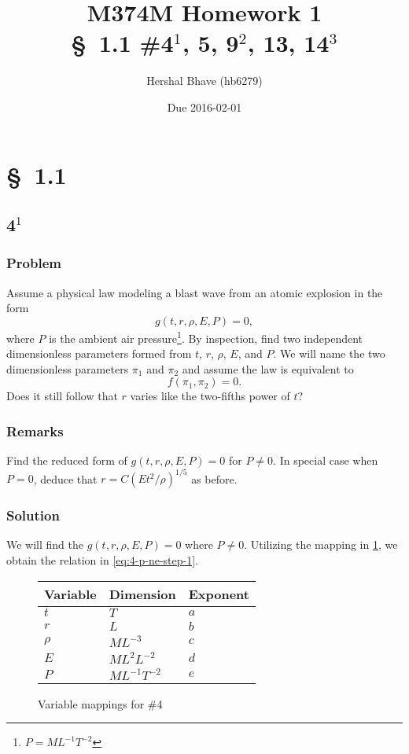 \documentclass[12pt]{article}
\title{M374M Homework 1 \\
  \normalsize{\S~1.1 \#4$^1$, 5, 9$^2$, 13, 14$^3$}}
\author{Hershal Bhave (hb6279)}
\date{Due 2016-02-01}
\begin{document}
\maketitle

\section{\S~1.1}
\subsection{4$^1$}
  \subsubsection*{Problem}
  Assume a physical law modeling a blast wave from an atomic explosion in the
  form
  \begin{equation}
    g(t,r,\rho,E,P)=0,
  \end{equation}
  where $P$ is the ambient air pressure\footnote{$P=M L^{-1} T^{-2}$}. By
  inspection, find two independent dimensionless parameters formed from $t$,
  $r$, $\rho$, $E$, and $P$. We will name the two dimensionless parameters $\pi_1$ and
  $\pi_2$ and assume the law is equivalent to
  \begin{equation}
    f(\pi_1,\pi_2)=0.
  \end{equation}
  Does it still follow that $r$ varies like the two-fifths power of $t$?

  \subsubsection*{Remarks}
  Find the reduced form of $g(t,r,\rho,E,P)=0$ for $P\ne0$. In special case when
  $P=0$, deduce that $r=C(Et^2/\rho)^{1/5}$ as before.

  \subsubsection*{Solution}
  We will find the  $g(t,r,\rho,E,P)=0$ where $P\ne0$. Utilizing the
  mapping in \cref{fig:4-var-mappings}, we obtain the relation in
  \cref{eq:4-p-ne-step-1}.

  \begin{figure}
    \centering
    \begin{tabularx}{0.5\textwidth}{XXX}
      Variable & Dimension & Exponent \\ \hline
      $t$ & $T$ & $a$ \\
      $r$ & $L$ & $b$ \\
      $\rho$ & $ML^{-3}$ & $c$ \\
      $E$ & $ML^{2}L^{-2}$ & $d$ \\
      $P$ & $ML^{-1}T^{-2}$ & $e$ \\
    \end{tabularx}
    \caption{Variable mappings for \#4}
    \label{fig:4-var-mappings}
  \end{figure}
\end{document}
